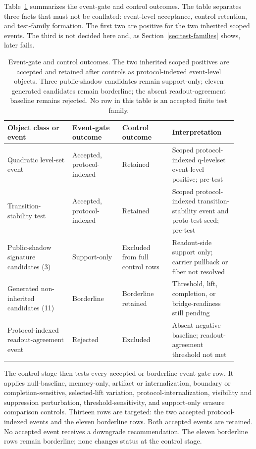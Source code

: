 \documentclass[11pt]{article}
\theoremstyle{definition}
\begin{document}
Table~\ref{tab:event-gate-control-outcomes} summarizes the event-gate and control outcomes. The table separates three facts that must not be conflated: event-level acceptance, control retention, and test-family formation. The first two are positive for the two inherited scoped events. The third is not decided here and, as Section~\ref{sec:test-families} shows, later fails.

\begin{table}[t]
\centering
\small
\setlength{\tabcolsep}{4pt}
\begin{tabular}{p{0.26\linewidth}p{0.20\linewidth}p{0.20\linewidth}p{0.26\linewidth}}
\hline
\textbf{Object class or event} & \textbf{Event-gate outcome} & \textbf{Control outcome} & \textbf{Interpretation} \\
\hline
Quadratic level-set event
&
Accepted, protocol-indexed
&
Retained
&
Scoped protocol-indexed q-levelset event-level positive; pre-test
\\[0.4em]
Transition-stability test
&
Accepted, protocol-indexed
&
Retained
&
Scoped protocol-indexed transition-stability event and proto-test seed; pre-test
\\[0.4em]
Public-shadow signature candidates (3)
&
Support-only
&
Excluded from full control rows
&
Readout-side support only; carrier pullback or fiber not resolved
\\[0.4em]
Generated non-inherited candidates (11)
&
Borderline
&
Borderline retained
&
Threshold, lift, completion, or bridge-readiness still pending
\\[0.4em]
Protocol-indexed readout-agreement event
&
Rejected
&
Excluded
&
Absent negative baseline; readout-agreement threshold not met
\\
\hline
\end{tabular}
\caption{Event-gate and control outcomes. The two inherited scoped positives are accepted and retained after controls as protocol-indexed event-level objects. Three public-shadow candidates remain support-only; eleven generated candidates remain borderline; the absent readout-agreement baseline remains rejected. No row in this table is an accepted finite test family.}
\label{tab:event-gate-control-outcomes}
\end{table}

The control stage then tests every accepted or borderline event-gate row. It applies null-baseline, memory-only, artifact or internalization, boundary or completion-sensitive, selected-lift variation, protocol-internalization, visibility and suppression perturbation, threshold-sensitivity, and support-only erasure comparison controls. Thirteen rows are targeted: the two accepted protocol-indexed events and the eleven borderline rows. Both accepted events are retained. No accepted event receives a downgrade recommendation. The eleven borderline rows remain borderline; none changes status at the control stage.
\end{document}

